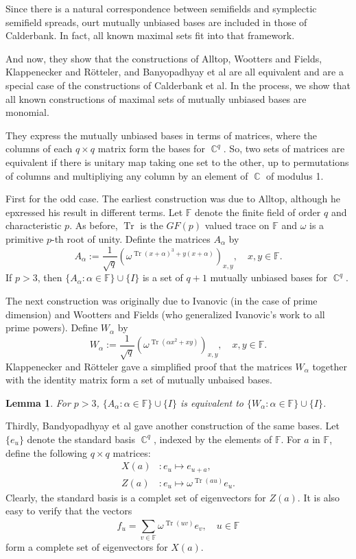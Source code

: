 \documentclass[a4paper]{article}
\DeclareMathOperator{\C}{\mathbb{C}}
\DeclareMathOperator{\Tr}{Tr}
\newtheorem{lemma}{Lemma}
\begin{document}
  Since there is a natural correspondence between semifields
  and symplectic semifield spreads, ourt mutually unbiased
  bases are included in those of Calderbank. In fact, all
  known maximal sets fit into that framework.

  And now, they show that the constructions of Alltop,
  Wootters and Fields, Klappenecker and Rötteler, and
  Banyopadhyay et al are all equivalent and are a special
  case of the constructions of Calderbank et al. In the
  process, we show that all known constructions of maximal
  sets of mutually unbiased bases are monomial.

  They express the mutually unbiased bases in terms of
  matrices, where the columns of each $q \times q$ matrix
  form the bases for $\C^{q}$. So, two sets of matrices are
  equivalent if there is unitary map taking one set to the
  other, up to permutations of columns and multipliying any
  column by an element of $\C$ of modulus 1.

  First for the odd case. The earliest construction was due
  to Alltop, although he epxressed his result in different
  terms. Let $\mathbb{F}$ denote the finite field of order
  $q$ and characteristic $p$. As before, $\Tr$ is the
  $GF(p)$ valued trace on $\mathbb{F}$ and $\omega$ is a
  primitive $p$-th root of unity. Definte the matrices
  $A_\alpha$ by
  \[
    A_\alpha := \frac{1}{\sqrt{q}} \left( 
      \omega^{\Tr(x+\alpha)^3+y(x+\alpha)}
    \right)_{x,y},
    \quad x,y \in \mathbb{F}.
  \] 
  If $p > 3$, then $\{A_\alpha : \alpha \in \mathbb{F}\}
  \cup \{I\}$ is a set of $q+1$ mutually unbiased bases for
  $\C^{q}$.

  The next construction was originally due to Ivanovic (in
  the case of prime dimension) and Wootters and Fields (who
  generalized Ivanovic's work to all prime powers). Define
  $W_\alpha$ by
  \[
    W_\alpha
    := \frac{1}{\sqrt{q}} \left( 
      \omega^{\Tr(\alpha x^2 + xy)}
    \right)_{x,y},
    \quad x,y \in \mathbb{F}.
  \] 
  Klappenecker and Rötteler gave a simplified proof that the
  matrices $W_\alpha$ together with the identity matrix form
  a set of mutually unbaised bases.

  \begin{lemma}
    For $p > 3$, $\{A_\alpha : \alpha \in \mathbb{F}\} \cup
    \{I\}$ is equivalent to $\{W_\alpha : \alpha \in
    \mathbb{F}\} \cup \{I\}$.
  \end{lemma}

  Thirdly, Bandyopadhyay et al gave another construction of
  the same bases. Let $\{e_u\}$ denote the standard basis
  $\C^{q}$, indexed by the elements of $\mathbb{F}$. For $a$
  in $\mathbb{F}$, define the following $q \times q$ 
  matrices:
  \begin{align*}
    X(a) &: e_u \mapsto e_{u+a},\\
    Z(a) &: e_u \mapsto \omega^{\Tr(au)} e_u
  .\end{align*}
  Clearly, the standard basis is a complet set of
  eigenvectors for $Z(a)$. It is also easy to verify that
  the vectors
  \[
    f_u = \sum_{v \in \mathbb{F}}^{} \omega^{\Tr(uv)} e_v,
    \quad u \in \mathbb{F}
  \] 
  form a complete set of eigenvectors for $X(a)$.
\end{document}
